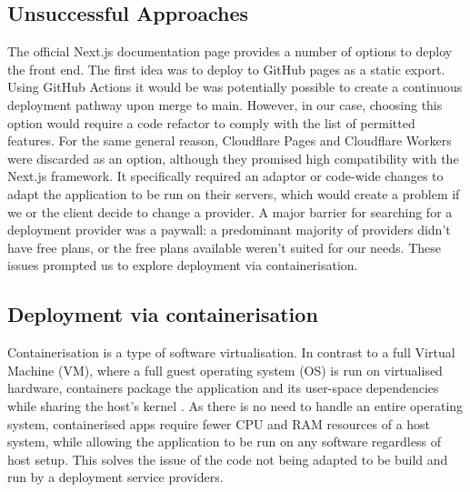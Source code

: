 \subsection{Unsuccessful Approaches}
The official Next.js documentation page \cite{vercelMainDeploymentMainPage} provides a number of options to deploy the front end. The first idea was to deploy to GitHub pages as a static export. Using GitHub Actions it would be was potentially possible to create a continuous deployment pathway upon merge to main. However, in our case, choosing this option would require a code refactor to comply with the list of permitted features. For the same general reason, Cloudflare Pages and Cloudflare Workers \cite{cloudflare_pages_workers} were discarded as an option, although they promised high compatibility with the Next.js framework.
 It specifically required an adaptor or code-wide changes to adapt the application to be run on their servers, which would create a problem if we or the client decide to change a provider. A major barrier for searching for a deployment provider was a paywall: a predominant majority of providers didn't have free plans, or the free plans available weren't suited for our needs. These issues prompted us to explore deployment via containerisation. 

\subsection{Deployment via containerisation}
Containerisation is a type of software virtualisation. In contrast to a full Virtual Machine (VM), where a full guest operating system (OS) is run on virtualised hardware, containers package the application and its user-space dependencies while sharing the host’s kernel \cite{containerisationArticle1, containerisationArticle2}. As there is no need to handle an entire operating system, containerised apps require fewer CPU and RAM resources of a host system, while allowing the application to be run on any software regardless of host setup. This solves the issue of the code not being adapted to be build and run by a deployment service providers.

